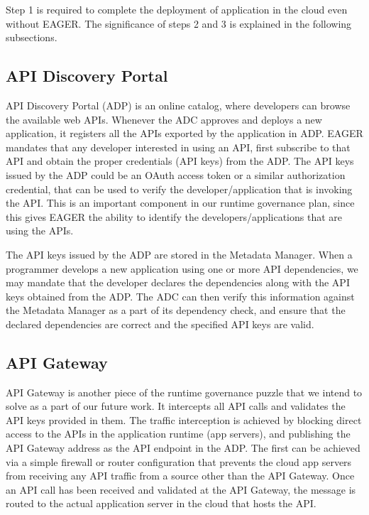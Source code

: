 Step 1 is required to complete the deployment of application in the cloud even without EAGER. The significance of steps 2 and 3 is explained in the 
following subsections.

\subsection{API Discovery Portal}
API Discovery Portal (ADP) is an online catalog, where developers can browse the available web APIs. Whenever the ADC
approves and deploys a new application, it registers all the APIs exported by the application in ADP. 
EAGER mandates that any developer interested in using an API, first subscribe to that
API and obtain the proper credentials (API keys) from the ADP. The API keys issued by the ADP could be an OAuth access token or a similar authorization
credential, that can be used to verify the developer/application that is invoking the API. This is an important component in our runtime governance
plan, since this gives EAGER the ability to identify the developers/applications that are using the APIs. 

The API keys issued by the ADP are stored in the Metadata Manager. When a programmer develops a new application
using one or more API dependencies, we may mandate that the developer declares the dependencies along with the API keys obtained from the ADP. The ADC
can then verify this information against the Metadata Manager as a part of its dependency check, and ensure that the declared dependencies are correct and 
the specified API keys are valid. %

\subsection{API Gateway}
API Gateway is another piece of the runtime governance puzzle that we intend to solve as a part of our future work. It intercepts all API calls and validates the API
keys provided in them. The traffic interception is achieved by blocking direct access to the APIs in the application runtime (app servers), and publishing the API 
Gateway address as the API endpoint in the ADP. The first can be achieved via a simple firewall or router configuration that prevents the cloud app servers from 
receiving any API traffic from a source other than the API Gateway. Once an API call has been received and validated at the API Gateway, the message is
routed to the actual application server in the cloud that hosts the API.


